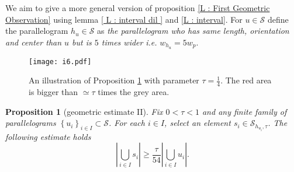 \documentclass{article}
\newtheorem{prp}{Proposition}
\begin{document}
We aim to give a more general version of proposition \ref{L : First Geometric Observation} using lemma \ref{ L : interval dil } and \ref{L : interval}. For $u \in \mathcal{S}$ define the parallelogram $h_u \in \mathcal{S}$ as \textit{the parallelogram who has same length, orientation and center than $u$ but is $5$ times wider} \textit{i.e.} $w_{h_u} = 5w_p$.



\begin{figure}[h!]
\centering
\texttt{[image: i6.pdf]}
\caption{An illustration of Proposition \ref{ prp : estimate geometric ; version décalé} with parameter $\tau = \frac{1}{4}$. The red area is bigger than $\simeq \tau$ times the grey area.}  
\end{figure}




\begin{prp}[geometric estimate II]\label{ prp : estimate geometric ; version décalé}
Fix $ 0 < \tau < 1$ and any finite family of parallelograms $\left\{u_i\right\}_{i \in I} \subset \mathcal{S}$. For each $i \in I$, select an element $s_i \in \mathcal{S}_{h_{u_i}, \tau}$. The following estimate holds $$\left|\bigcup_{i \in I} s_i \right| \geq \frac{\tau}{54}\left|\bigcup_{i \in I} u_i\right|.$$
\end{prp}
\end{document}
